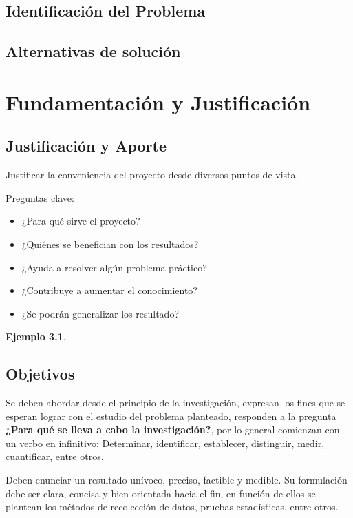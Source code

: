 \documentclass[letter,12pt]{report}
\newcommand\naranjo[1]{\textcolor[rgb]{1.00,0.36,0.06}{\textbf{#1}}}
\newtheorem{ejemplo}{Ejemplo}
\begin{document}
\section{Identificación del Problema}

\section{Alternativas de solución}\label{alternativas}

\chapter{Fundamentación y Justificación}\label{fundamentacion}
\section{Justificación y Aporte}
Justificar la conveniencia del proyecto desde diversos puntos de vista.

Preguntas clave:
  \begin{itemize}
  \item ¿Para qué sirve el proyecto?
  \item ¿Quiénes se benefician con los resultados?
  \item ¿Ayuda a resolver algún problema práctico?
  \item ¿Contribuye a aumentar el conocimiento?
  \item ¿Se podrán generalizar los resultado?
\end{itemize}


\begin{ejemplo}
\blindtext %
\end{ejemplo}


\section{Objetivos}\label{objetivos}

Se deben abordar desde el principio de la investigación, expresan los fines que se esperan lograr con el estudio del problema planteado, responden a la pregunta \naranjo{¿Para qué se lleva a cabo la investigación?}, por lo general comienzan con un verbo en infinitivo: Determinar, identificar, establecer, distinguir, medir, cuantificar, entre otros.

Deben enunciar un resultado unívoco, preciso, factible y medible. Su formulación debe ser clara, concisa y bien orientada hacia el fin, en función de ellos se plantean los métodos de recolección de datos, pruebas estadísticas, entre otros.
\end{document}
